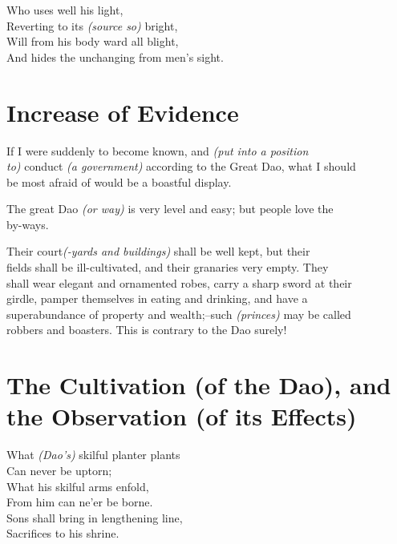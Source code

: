     Who uses well his light,\\
    Reverting to its \textit{(source so)} bright,\\
    Will from his body ward all blight,\\
    And hides the unchanging from men's sight.\vspace{\baselineskip}

\section*{Increase of Evidence}
    If I were suddenly to become known, and \textit{(put into a position\\
    to)} conduct \textit{(a government)} according to the Great Dao, what I should\\
    be most afraid of would be a boastful display.\vspace{\baselineskip}
    
    The great Dao \textit{(or way)} is very level and easy; but people love the\\
    by-ways.\vspace{\baselineskip}
    
    Their court\textit{(-yards and buildings)} shall be well kept, but their\\
    fields shall be ill-cultivated, and their granaries very empty. They\\
    shall wear elegant and ornamented robes, carry a sharp sword at their\\
    girdle, pamper themselves in eating and drinking, and have a\\
    superabundance of property and wealth;--such \textit{(princes)} may be called\\
    robbers and boasters. This is contrary to the Dao surely!\vspace{\baselineskip}
    
\section*{The Cultivation (of the Dao), and the Observation (of its Effects)}
    What \textit{(Dao's)} skilful planter plants\\
    Can never be uptorn;\\
    What his skilful arms enfold,\\
    From him can ne'er be borne.\\
    Sons shall bring in lengthening line,\\
    Sacrifices to his shrine.\vspace{\baselineskip}
    
